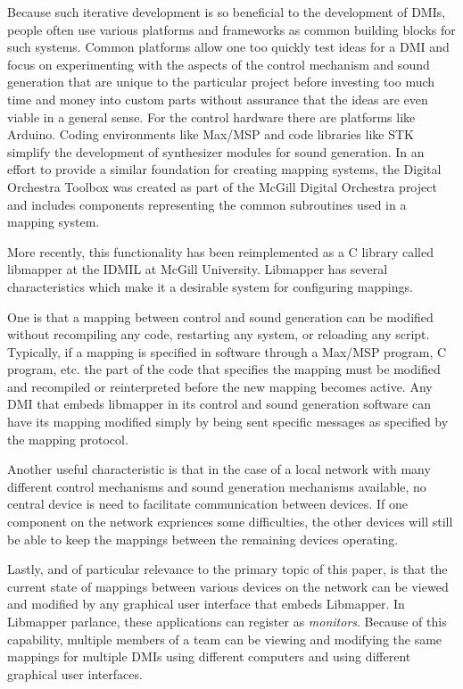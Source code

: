 Because such iterative development is so beneficial to the development of DMIs, people often use various platforms and frameworks as common building blocks for such systems. Common platforms allow one too quickly test ideas for a DMI and focus on experimenting with the aspects of the control mechanism and sound generation that are unique to the particular project before investing too much time and money into custom parts without assurance that the ideas are even viable in a general sense. For the control hardware there are platforms like Arduino. Coding environments like Max/MSP and code libraries like STK simplify the development of synthesizer modules for sound generation. In an effort to provide a similar foundation for creating mapping systems, the Digital Orchestra Toolbox was created as part of the McGill Digital Orchestra project and includes components representing the common subroutines used in a mapping system. 

More recently, this functionality has been reimplemented as a C library called libmapper at the IDMIL at McGill University. Libmapper has several characteristics which make it a desirable system for configuring mappings. 

One is that a mapping between control and sound generation can be modified without recompiling any code, restarting any system, or reloading any script. Typically, if a mapping is specified in software through a Max/MSP program, C program, etc. the part of the code that specifies the mapping must be modified and recompiled or reinterpreted before the new mapping becomes active. Any DMI that embeds libmapper in its control and sound generation software can have its mapping modified simply by being sent specific messages as specified by the mapping protocol. 

Another useful characteristic is that in the case of a local network with many different control mechanisms and sound generation mechanisms available, no central device is need to facilitate communication between devices. If one component on the network expriences some difficulties, the other devices will still be able to keep the mappings between the remaining devices operating.  

Lastly, and of particular relevance to the primary topic of this paper, is that the current state of mappings between various devices on the network can be viewed and modified by any graphical user interface that embeds Libmapper. In Libmapper parlance, these applications can register as \emph{monitors}. Because of this capability, multiple members of a team can be viewing and modifying the same mappings for multiple DMIs using different computers and using different graphical user interfaces.  

